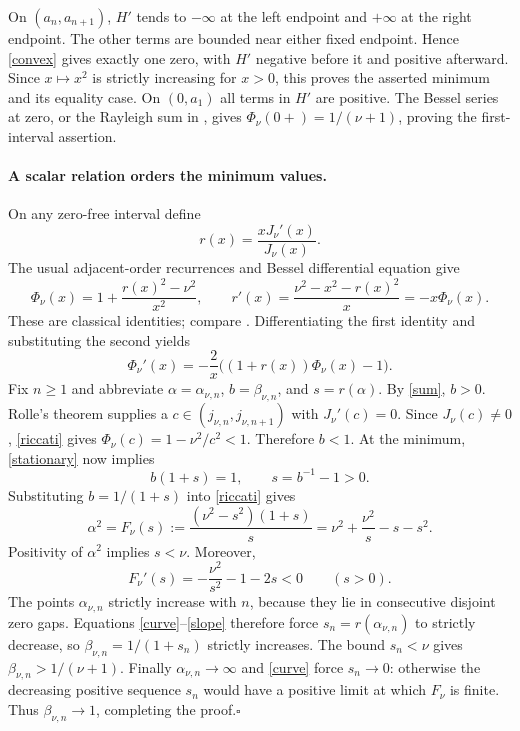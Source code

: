 \documentclass[11pt]{article}
\begin{document}
\newpage
On $(a_n,a_{n+1})$, $H'$ tends to $-\infty$ at the left endpoint and
$+\infty$ at the right endpoint. The other terms are bounded near either
fixed endpoint. Hence \eqref{convex} gives exactly one zero, with $H'$
negative before it and positive afterward. Since $x\mapsto x^2$ is
strictly increasing for $x>0$, this proves the asserted minimum and its
equality case. On $(0,a_1)$ all terms in $H'$ are positive. The Bessel
series at zero, or the Rayleigh sum in \cite{B}, gives
$\Phi_\nu(0+)=1/(\nu+1)$, proving the first-interval assertion.

\paragraph{A scalar relation orders the minimum values.}
On any zero-free interval define
\[
 r(x)=\frac{xJ_\nu'(x)}{J_\nu(x)}.
\]
The usual adjacent-order recurrences and Bessel differential equation give
\begin{equation}\label{riccati}
 \Phi_\nu(x)=1+\frac{r(x)^2-\nu^2}{x^2},\qquad
 r'(x)=\frac{\nu^2-x^2-r(x)^2}{x}=-x\Phi_\nu(x).
\end{equation}
These are classical identities; compare \cite[Eqs.~(17) and following]{BPS}.
Differentiating the first identity and substituting the second yields
\begin{equation}\label{stationary}
 \Phi_\nu'(x)=-\frac2x\bigl((1+r(x))\Phi_\nu(x)-1\bigr).
\end{equation}
Fix $n\ge1$ and abbreviate $\alpha=\alpha_{\nu,n}$, $b=\beta_{\nu,n}$,
and $s=r(\alpha)$. By \eqref{sum}, $b>0$. Rolle's theorem supplies a
$c\in(j_{\nu,n},j_{\nu,n+1})$ with $J_\nu'(c)=0$. Since $J_\nu(c)\ne0$,
\eqref{riccati} gives $\Phi_\nu(c)=1-\nu^2/c^2<1$. Therefore $b<1$.
At the minimum, \eqref{stationary} now implies
\[
 b(1+s)=1,\qquad s=b^{-1}-1>0.
\]
Substituting $b=1/(1+s)$ into \eqref{riccati} gives
\begin{equation}\label{curve}
 \alpha^2=F_\nu(s):=\frac{(\nu^2-s^2)(1+s)}s
 =\nu^2+\frac{\nu^2}s-s-s^2.
\end{equation}
Positivity of $\alpha^2$ implies $s<\nu$. Moreover,
\begin{equation}\label{slope}
 F_\nu'(s)=-\frac{\nu^2}{s^2}-1-2s<0\qquad(s>0).
\end{equation}
The points $\alpha_{\nu,n}$ strictly increase with $n$, because they lie
in consecutive disjoint zero gaps. Equations \eqref{curve}--\eqref{slope}
therefore force $s_n=r(\alpha_{\nu,n})$ to strictly decrease, so
$\beta_{\nu,n}=1/(1+s_n)$ strictly increases. The bound $s_n<\nu$ gives
$\beta_{\nu,n}>1/(\nu+1)$. Finally $\alpha_{\nu,n}\to\infty$ and
\eqref{curve} force $s_n\to0$: otherwise the decreasing positive sequence
$s_n$ would have a positive limit at which $F_\nu$ is finite. Thus
$\beta_{\nu,n}\to1$, completing the proof.\hfill$\square$
\end{document}

